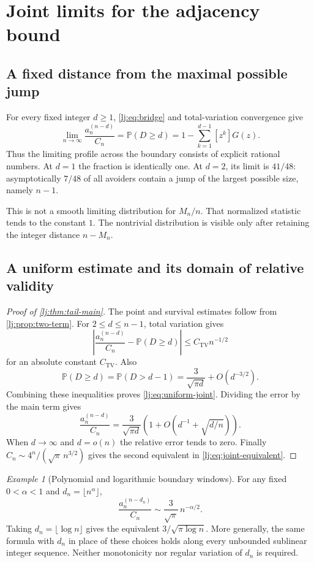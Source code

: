 \documentclass[11pt,a4paper]{article}
\theoremstyle{definition}\newaliascnt{definition}{theorem}
\theoremstyle{remark}\newaliascnt{remark}{theorem}
\newtheorem{example}[example]{Example}
\newcommand{\ljP}{\mathbb P}
\begin{document}
\section{Joint limits for the adjacency bound}
\label{lj:sec:joint}

\subsection{A fixed distance from the maximal possible jump}
For every fixed integer $d\ge1$, \eqref{lj:eq:bridge} and total-variation
convergence give
\begin{equation}
 \lim_{n\to\infty}\frac{a_n^{(n-d)}}{C_n}
 =\ljP(D\ge d)
 =1-\sum_{k=1}^{d-1}[z^k]G(z).
 \label{lj:eq:fixed-window}
\end{equation}
Thus the limiting profile across the boundary consists of explicit
rational numbers. At $d=1$ the fraction is identically one. At $d=2$,
its limit is $41/48$: asymptotically $7/48$ of all avoiders contain a
jump of the largest possible size, namely $n-1$.

This is not a smooth limiting distribution for $M_n/n$. That normalized
statistic tends to the constant $1$. The nontrivial distribution is
visible only after retaining the integer distance $n-M_n$.

\subsection{A uniform estimate and its domain of relative validity}
\begin{proof}[Proof of \cref{lj:thm:tail-main}]
The point and survival estimates follow from \cref{lj:prop:two-term}.
For $2\le d\le n-1$, total variation gives
\[
 \left|\frac{a_n^{(n-d)}}{C_n}-\ljP(D\ge d)\right|
 \le C_{\mathrm{TV}} n^{-1/2}
\]
for an absolute constant $C_{\mathrm{TV}}$. Also
\[
 \ljP(D\ge d)=\ljP(D>d-1)
 =\frac3{\sqrt{\pi d}}+O(d^{-3/2}).
\]
Combining these inequalities proves \eqref{lj:eq:uniform-joint}.
Dividing the error by the main term gives
\begin{equation}
 \frac{a_n^{(n-d)}}{C_n}
 =\frac3{\sqrt{\pi d}}
   \left(1+O\left(d^{-1}+\sqrt{d/n}\right)\right).
 \label{lj:eq:relative-joint}
\end{equation}
When $d\to\infty$ and $d=o(n)$ the relative error tends to zero.
Finally $C_n\sim4^n/(\sqrt\pi\,n^{3/2})$ gives the second equivalent
in \eqref{lj:eq:joint-equivalent}.
\end{proof}

\begin{example}[Polynomial and logarithmic boundary windows]
For any fixed $0<\alpha<1$ and $d_n=\lfloor n^\alpha\rfloor$,
\[
 \frac{a_n^{(n-d_n)}}{C_n}
 \sim\frac3{\sqrt\pi}\,n^{-\alpha/2}.
\]
Taking $d_n=\lfloor\log n\rfloor$ gives the equivalent
$3/\sqrt{\pi\log n}$. More generally, the same formula with
$d_n$ in place of these choices holds along every unbounded sublinear
integer sequence. Neither monotonicity nor regular variation of $d_n$
is required.
\end{example}
\end{document}
